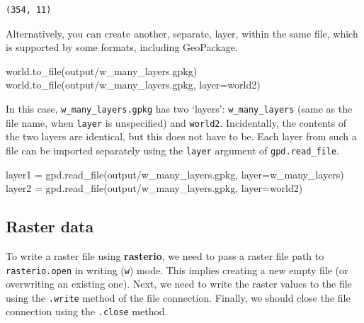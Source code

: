 \documentclass[
  letterpaper,
]{krantz}
\newenvironment{Shaded}{\begin{snugshade}}{\end{snugshade}}
\newcommand{\NormalTok}[1]{\textcolor[rgb]{0.00,0.23,0.31}{#1}}
\newcommand{\OperatorTok}[1]{\textcolor[rgb]{0.37,0.37,0.37}{#1}}
\newcommand{\StringTok}[1]{\textcolor[rgb]{0.13,0.47,0.30}{#1}}
\begin{document}
\begin{verbatim}
(354, 11)
\end{verbatim}

Alternatively, you can create another, separate, layer, within the same
file, which is supported by some formats, including GeoPackage.

\begin{Shaded}
\begin{Highlighting}[]
\NormalTok{world.to\_file(}\StringTok{\textquotesingle{}output/w\_many\_layers.gpkg\textquotesingle{}}\NormalTok{)}
\NormalTok{world.to\_file(}\StringTok{\textquotesingle{}output/w\_many\_layers.gpkg\textquotesingle{}}\NormalTok{, layer}\OperatorTok{=}\StringTok{\textquotesingle{}world2\textquotesingle{}}\NormalTok{)}
\end{Highlighting}
\end{Shaded}

In this case, \texttt{w\_many\_layers.gpkg} has two `layers':
\texttt{w\_many\_layers} (same as the file name, when \texttt{layer} is
unspecified) and \texttt{world2}. Incidentally, the contents of the two
layers are identical, but this does not have to be. Each layer from such
a file can be imported separately using the \texttt{layer} argument of
\texttt{gpd.read\_file}.

\begin{Shaded}
\begin{Highlighting}[]
\NormalTok{layer1 }\OperatorTok{=}\NormalTok{ gpd.read\_file(}\StringTok{\textquotesingle{}output/w\_many\_layers.gpkg\textquotesingle{}}\NormalTok{, layer}\OperatorTok{=}\StringTok{\textquotesingle{}w\_many\_layers\textquotesingle{}}\NormalTok{)}
\NormalTok{layer2 }\OperatorTok{=}\NormalTok{ gpd.read\_file(}\StringTok{\textquotesingle{}output/w\_many\_layers.gpkg\textquotesingle{}}\NormalTok{, layer}\OperatorTok{=}\StringTok{\textquotesingle{}world2\textquotesingle{}}\NormalTok{)}
\end{Highlighting}
\end{Shaded}

\subsection{Raster data}\label{sec-data-output-raster}

To write a raster file using \textbf{rasterio}, we need to pass a raster
file path to \texttt{rasterio.open} in writing
(\texttt{\textquotesingle{}w\textquotesingle{}}) mode. This implies
creating a new empty file (or overwriting an existing one). Next, we
need to write the raster values to the file using the \texttt{.write}
method of the file connection. Finally, we should close the file
connection using the \texttt{.close} method.
\end{document}
